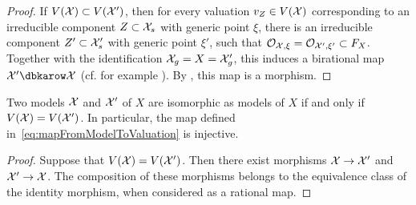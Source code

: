 \begin{proof}
    If $V(\mathcal X) \subset V(\mathcal X')$, then for every valuation $v_Z \in V(\mathcal X)$ corresponding to an irreducible component $Z\subset \mathcal X_s$ with generic point $\xi$,
    there is an irreducible component $Z' \subset \mathcal X'_s$ with generic point $\xi'$, such that $\mathcal{O}_{\mathcal X,\xi} = \mathcal{O}_{\mathcal X',\xi'} \subset F_X$.
    Together with the identification $\mathcal X_g = X = \mathcal X'_g$, this induces a birational map $\X' \dbkarow \X$ (cf. for example \cite[Lemma 29.50.2.]{Stacks}).
    By \cite[Theorem 8.3.20]{Liu}, this map is a morphism.
\end{proof}

\begin{corollary}
    Two models $\mathcal X$ and $\mathcal X'$ of $X$ are isomorphic as models of $X$ if and only if $V(\mathcal X) = V(\mathcal X')$.
    In particular, the map defined in~\eqref{eq:mapFromModelToValuation} is injective.
\end{corollary}

\begin{proof}
    Suppose that $V(\mathcal X) = V(\mathcal X')$.
    Then there exist morphisms $\mathcal X\to \mathcal X'$ and $\mathcal X' \to \mathcal X$.
    The composition of these morphisms belongs to the equivalence class of the identity morphism, when considered as a rational map.
\end{proof}

